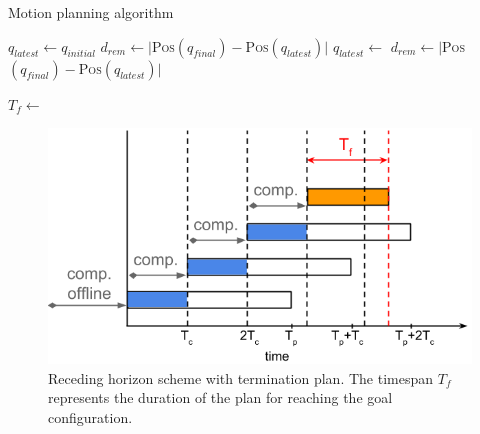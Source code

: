 \documentclass[eprint]{actapoly}
\begin{document}
\begin{algorithm}
    \caption{Motion planning algorithm\label{cod:algo}}
    \label{swpa}
    \begin{algorithmic}[1] %
	    \State $q_{latest} \gets q_{initial}$
	    \State $d_{rem} \gets |${\scshape Pos}$(q_{final}) - ${\scshape Pos}$(q_{latest})|$
	    \State {}
		\State $q_{latest} \gets $
		\State $d_{rem} \gets |${\scshape Pos}$(q_{final}) - ${\scshape Pos}$(q_{latest})|$
		
	    \EndWhile\label{planningwhile}
	    \State {}
	    \State $T_f \gets $
	    
        \EndProcedure
    \end{algorithmic}
\end{algorithm}

\begin{figure}[!h]
  \centering
  \includegraphics[width=\linewidth]{./images/recedinghorizon.png} %
  \caption{Receding horizon scheme with termination plan. The timespan $T_f$ represents the duration of the plan for reaching the goal configuration.\label{fig:recedinghor}}
\end{figure}
\end{document}
